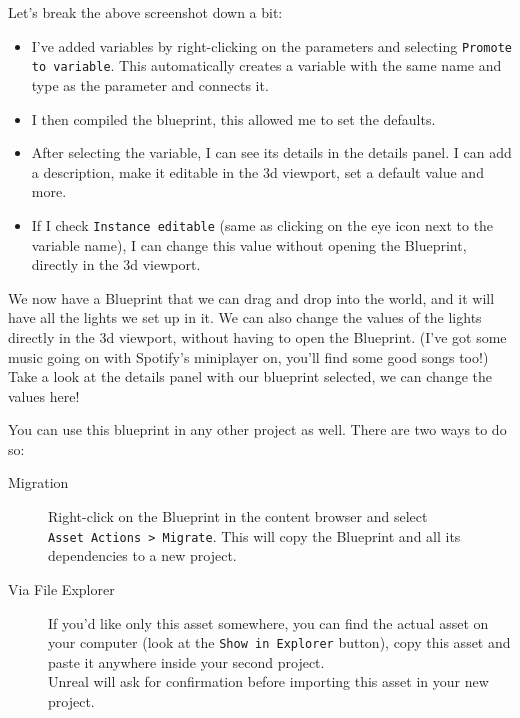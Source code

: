 \documentclass{article}
\begin{document}
\newpage
{}



Let's break the above screenshot down a bit:

\begin{itemize}
    \item I've added variables by right-clicking on the parameters and selecting \verb|Promote to variable|. This automatically creates a variable with the same name and type as the parameter and connects it.
    \item I then compiled the blueprint, this allowed me to set the defaults.
    \item After selecting the variable, I can see its details in the details panel. I can add a description, make it editable in the 3d viewport, set a default value and more.
    \item If I check \verb|Instance editable| (same as clicking on the eye icon next to the variable name), I can change this value without opening the Blueprint, directly in the 3d viewport.
\end{itemize}

We now have a Blueprint that we can drag and drop into the world, and it will have all the lights we set up in it. We can also change the values of the lights directly in the 3d viewport, without having to open the Blueprint.
\newpage
{}
(I've got some music going on with Spotify's miniplayer on, you'll find some good songs too!)\\[10pt]

Take a look at the details panel with our blueprint selected, we can change the values here! 

You can use this blueprint in any other project as well. There are two ways to do so:
\begin{description}
    \item[Migration] Right-click on the Blueprint in the content browser and select \\\verb|Asset Actions > Migrate|. This will copy the Blueprint and all its dependencies to a new project. 
    \item[Via File Explorer] If you'd like only this asset somewhere, you can find the actual asset on your computer (look at the \verb|Show in Explorer| button), copy this asset and paste it anywhere inside your second project.  \\ Unreal will ask for confirmation before importing this asset in your new project.
\end{description}
\end{document}
